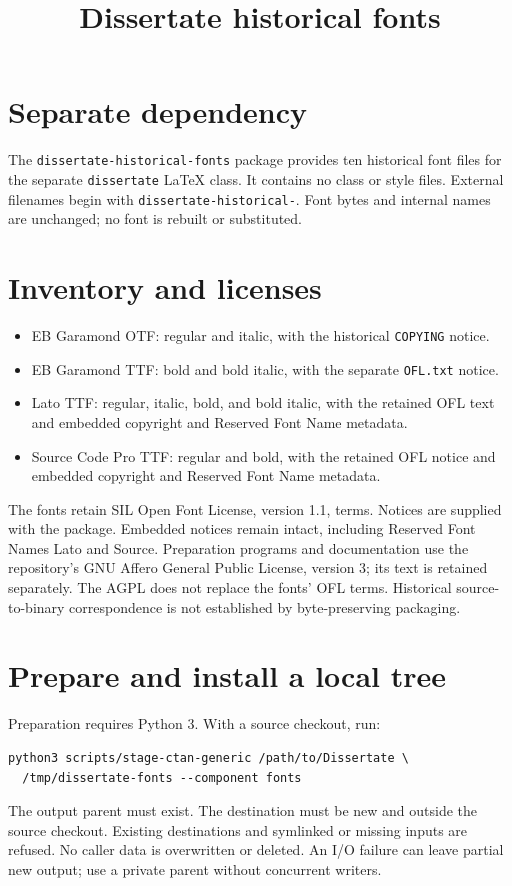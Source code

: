 \documentclass[10pt,letterpaper]{article}
\title{Dissertate historical fonts}
\author{}
\date{}
\begin{document}
\maketitle
\raggedright
\section*{Separate dependency}
The \texttt{dissertate-historical-fonts} package provides ten historical font
files for the separate \texttt{dissertate} LaTeX class. It contains no class or
style files. External filenames begin with \texttt{dissertate-historical-}.
Font bytes and internal names are unchanged; no font is rebuilt or substituted.
\section*{Inventory and licenses}
\begin{itemize}
\item EB Garamond OTF: regular and italic, with the historical \texttt{COPYING} notice.
\item EB Garamond TTF: bold and bold italic, with the separate \texttt{OFL.txt} notice.
\item Lato TTF: regular, italic, bold, and bold italic, with the retained OFL text and embedded copyright and Reserved Font Name metadata.
\item Source Code Pro TTF: regular and bold, with the retained OFL notice and embedded copyright and Reserved Font Name metadata.
\end{itemize}
The fonts retain SIL Open Font License, version 1.1, terms. Notices are supplied
with the package. Embedded notices remain intact, including Reserved Font Names
Lato and Source. Preparation programs and documentation use the repository's GNU
Affero General Public License, version 3; its text is retained separately. The
AGPL does not replace the fonts' OFL terms. Historical source-to-binary
correspondence is not established by byte-preserving packaging.
\section*{Prepare and install a local tree}
Preparation requires Python 3. With a source checkout, run:
\begin{verbatim}
python3 scripts/stage-ctan-generic /path/to/Dissertate \
  /tmp/dissertate-fonts --component fonts
\end{verbatim}
The output parent must exist. The destination must be new and outside the source
checkout. Existing destinations and symlinked or missing inputs are refused.
No caller data is overwritten or deleted. An I/O failure can leave partial new
output; use a private parent without concurrent writers.
\end{document}
